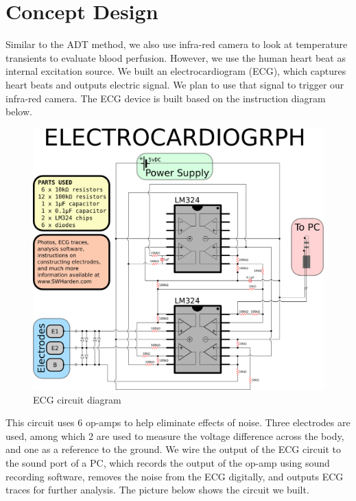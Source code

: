 \documentclass[paper=letter, fontsize=11pt]{scrartcl}
\numberwithin{equation}{section}		%
\numberwithin{figure}{section}			%
\numberwithin{table}{section}			%
\begin{document}
\section{Concept Design}
Similar to the ADT method, we also use infra-red camera to look at temperature transients to evaluate blood perfusion. 
However, we use the human heart beat as internal excitation source. We built an electrocardiogram (ECG), which captures 
heart beats and outputs electric signal. We plan to use that signal to trigger our infra-red camera. The ECG device is 
built based on the instruction diagram below.
\begin{figure}[H]
    \centering
        \includegraphics[scale=0.4]{ecg_circuit_diagram.png}
        \caption{ECG circuit diagram}
\end{figure}
This circuit uses 6 op-amps to help eliminate effects of noise. Three electrodes are used, among which 2 are used 
to measure the voltage difference across the body, and one as a reference to the ground. We wire the output of the ECG 
circuit to the sound port of a PC, which records the output of the op-amp using sound recording software, removes the 
noise from the ECG digitally, and outputs ECG traces for further analysis. The picture below shows the circuit we built.
\end{document}
